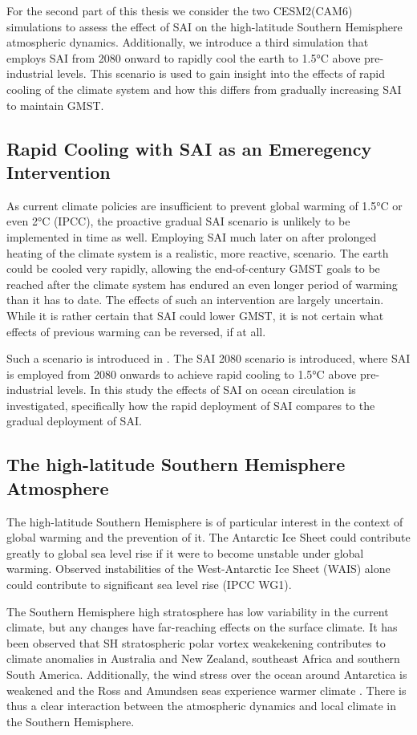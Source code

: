 For the second part of this thesis we consider the two CESM2(CAM6) simulations to assess the effect of SAI on the high-latitude Southern Hemisphere atmospheric dynamics. Additionally, we introduce a third simulation that employs SAI from 2080 onward to rapidly cool the earth to 1.5°C above pre-industrial levels. This scenario is used to gain insight into the effects of rapid cooling of the climate system and how this differs from gradually increasing SAI to maintain GMST.

\subsection{Rapid Cooling with SAI as an Emeregency Intervention}
As current climate policies are insufficient to prevent global warming of 1.5°C or even 2°C (IPCC), the proactive gradual SAI scenario is unlikely to be implemented in time as well. Employing SAI much later on after prolonged heating of the climate system is a realistic, more reactive, scenario. The earth could be cooled very rapidly, allowing the end-of-century GMST goals to be reached after the climate system has endured an even longer period of warming than it has to date. The effects of such an intervention are largely uncertain. While it is rather certain that SAI could lower GMST, it is not certain what effects of previous warming can be reversed, if at all. 

Such a scenario is introduced in \textcite{pfluger2024}. The SAI 2080 scenario is introduced, where SAI is employed from 2080 onwards to achieve rapid cooling to 1.5°C above pre-industrial levels. In this study the effects of SAI on ocean circulation is investigated, specifically how the rapid deployment of SAI compares to the gradual deployment of SAI. 

\subsection{The high-latitude Southern Hemisphere Atmosphere}
The high-latitude Southern Hemisphere is of particular interest in the context of global warming and the prevention of it. The Antarctic Ice Sheet could contribute greatly to global sea level rise if it were to become unstable under global warming. Observed instabilities of the West-Antarctic Ice Sheet (WAIS) alone could contribute to significant sea level rise (IPCC WG1). 

The Southern Hemisphere high stratosphere has low variability in the current climate, but any changes have far-reaching effects on the surface climate.  It has been observed that SH stratospheric polar vortex weakekening contributes to climate anomalies in Australia and New Zealand, southeast Africa and southern South America. Additionally, the wind stress over the ocean around Antarctica is weakened and the Ross and Amundsen seas experience warmer climate \parencite{domeisen2020}. There is thus a clear interaction between the atmospheric dynamics and local climate in the Southern Hemisphere. 

